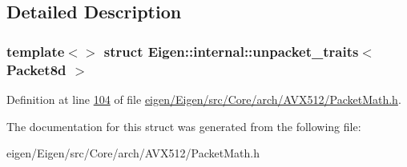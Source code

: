 \subsection{Detailed Description}
\subsubsection*{template$<$$>$\newline
struct Eigen\+::internal\+::unpacket\+\_\+traits$<$ Packet8d $>$}



Definition at line \hyperlink{eigen_2_eigen_2src_2_core_2arch_2_a_v_x512_2_packet_math_8h_source_l00104}{104} of file \hyperlink{eigen_2_eigen_2src_2_core_2arch_2_a_v_x512_2_packet_math_8h_source}{eigen/\+Eigen/src/\+Core/arch/\+A\+V\+X512/\+Packet\+Math.\+h}.



The documentation for this struct was generated from the following file\+:\begin{DoxyCompactItemize}
\item 
eigen/\+Eigen/src/\+Core/arch/\+A\+V\+X512/\+Packet\+Math.\+h\end{DoxyCompactItemize}
